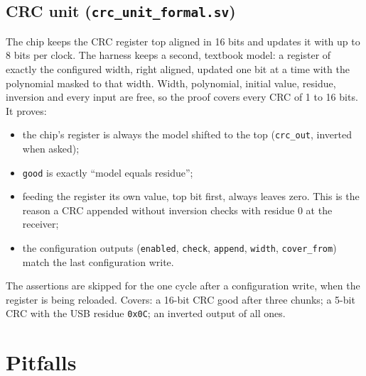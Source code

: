 \documentclass[11pt,a4paper]{article}
\newcommand{\file}[1]{\texttt{#1}}
\begin{document}
\subsection{CRC unit (\file{crc\_unit\_formal.sv})}
The chip keeps the CRC register top aligned in 16 bits and updates it with up to 8 bits per clock. The harness keeps a second, textbook model: a register of exactly the configured width, right aligned, updated one bit at a time with the polynomial masked to that width. Width, polynomial, initial value, residue, inversion and every input are free, so the proof covers every CRC of 1 to 16 bits. It proves:
\begin{itemize}
\item the chip's register is always the model shifted to the top (\texttt{crc\_out}, inverted when asked);
\item \texttt{good} is exactly ``model equals residue'';
\item feeding the register its own value, top bit first, always leaves zero. This is the reason a CRC appended without inversion checks with residue 0 at the receiver;
\item the configuration outputs (\texttt{enabled}, \texttt{check}, \texttt{append}, \texttt{width}, \texttt{cover\_from}) match the last configuration write.
\end{itemize}
The assertions are skipped for the one cycle after a configuration write, when the register is being reloaded. Covers: a 16-bit CRC good after three chunks; a 5-bit CRC with the USB residue \texttt{0x0C}; an inverted output of all ones.

\section{Pitfalls}
\end{document}

